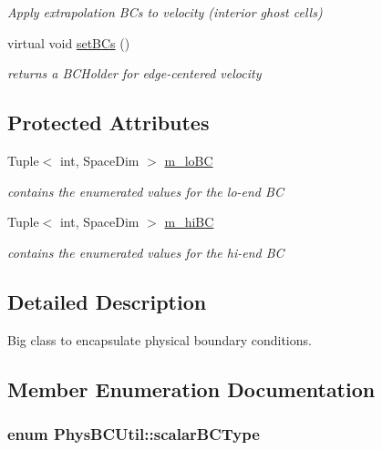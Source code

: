 \begin{DoxyCompactItemize}
\begin{DoxyCompactList}\small\item\em Apply extrapolation B\-Cs to velocity (interior ghost cells) \end{DoxyCompactList}\item 
virtual void \hyperlink{class_phys_b_c_util_a5abe105b9a924f6401b78ab6a5b4b1ab}{set\-B\-Cs} ()
\begin{DoxyCompactList}\small\item\em returns a B\-C\-Holder for edge-\/centered velocity \end{DoxyCompactList}\end{DoxyCompactItemize}
\subsection*{Protected Attributes}
\begin{DoxyCompactItemize}
\item 
\hypertarget{class_phys_b_c_util_a4c1aae9e1f5a676c93e0cd3bd7100f0b}{Tuple$<$ int, Space\-Dim $>$ \hyperlink{class_phys_b_c_util_a4c1aae9e1f5a676c93e0cd3bd7100f0b}{m\-\_\-lo\-B\-C}}\label{class_phys_b_c_util_a4c1aae9e1f5a676c93e0cd3bd7100f0b}

\begin{DoxyCompactList}\small\item\em contains the enumerated values for the lo-\/end B\-C \end{DoxyCompactList}\item 
\hypertarget{class_phys_b_c_util_a3469ac43534392033eb7d99c2398947b}{Tuple$<$ int, Space\-Dim $>$ \hyperlink{class_phys_b_c_util_a3469ac43534392033eb7d99c2398947b}{m\-\_\-hi\-B\-C}}\label{class_phys_b_c_util_a3469ac43534392033eb7d99c2398947b}

\begin{DoxyCompactList}\small\item\em contains the enumerated values for the hi-\/end B\-C \end{DoxyCompactList}\end{DoxyCompactItemize}


\subsection{Detailed Description}
Big class to encapsulate physical boundary conditions. 

\subsection{Member Enumeration Documentation}
\hypertarget{class_phys_b_c_util_a1beb9821cf9e783e3742b82b7070c97a}{
\subsubsection[{scalar\-B\-C\-Type}]{\setlength{\rightskip}{0pt plus 5cm}enum {\bf Phys\-B\-C\-Util\-::scalar\-B\-C\-Type}}}\label{class_phys_b_c_util_a1beb9821cf9e783e3742b82b7070c97a}


